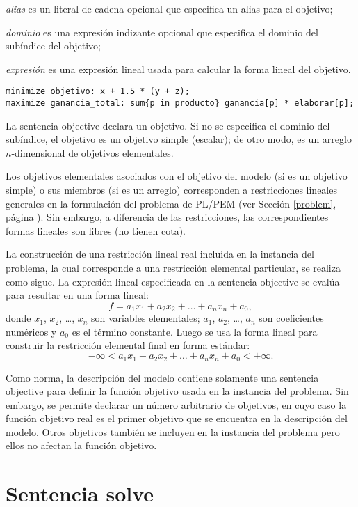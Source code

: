 \documentclass[11pt,spanish]{report}
\def\para#1{\noindent{\bf#1}}
\begin{document}
\noindent
{\it alias} es un literal de cadena opcional que especifica un alias para el objetivo;

\noindent
{\it dominio} es una expresión indizante opcional que especifica el dominio del subíndice del objetivo;

\noindent
{\it expresión} es una expresión lineal usada para calcular la forma lineal del objetivo.

\para{Ejemplos}

\begin{verbatim}
minimize objetivo: x + 1.5 * (y + z);
maximize ganancia_total: sum{p in producto} ganancia[p] * elaborar[p];
\end{verbatim}

La sentencia objective declara un objetivo. Si no se especifica el dominio del subíndice, el objetivo es un objetivo simple (escalar); de otro modo, es un arreglo $n$-dimensional de objetivos elementales.

Los objetivos elementales asociados con el objetivo del modelo (si es un objetivo simple) o sus miembros (si es un arreglo) corresponden a restricciones lineales generales en la formulación del problema de PL/PEM (ver Sección \ref{problem}, página \pageref{problem}). Sin embargo, a diferencia de las restricciones, las correspondientes formas lineales son libres (no tienen cota).

La construcción de una restricción lineal real incluida en la instancia del problema, la cual corresponde a una restricción elemental particular, se realiza como sigue. La expresión lineal especificada en la sentencia objective se evalúa para resultar en una forma lineal:
$$f=a_1x_1+a_2x_2+\dots+a_nx_n+a_0,$$
donde $x_1$, $x_2$, \dots, $x_n$ son variables elementales; $a_1$, $a_2$,
\dots, $a_n$ son coeficientes numéricos y $a_0$ es el término constante. Luego se usa la forma lineal para construir la restricción elemental final en forma estándar:
$$-\infty<a_1x_1+a_2x_2+\dots+a_nx_n+a_0<+\infty.$$

Como norma, la descripción del modelo contiene solamente una sentencia objective para definir la función objetivo usada en la instancia del problema. Sin embargo, se permite declarar un número arbitrario de objetivos, en cuyo caso la función objetivo real es el primer objetivo que se encuentra en la descripción del modelo. Otros objetivos también se incluyen en la instancia del problema pero ellos no afectan la función objetivo.

\section{Sentencia solve}
\end{document}
